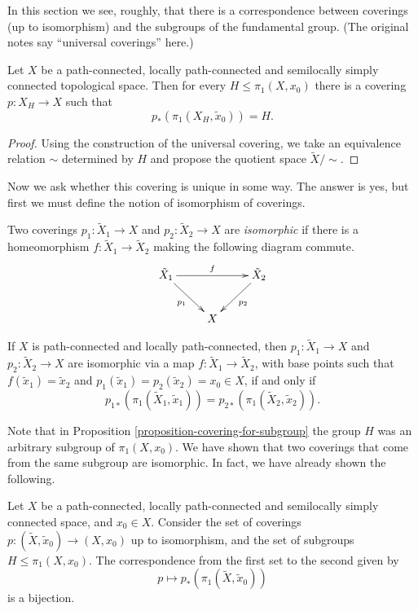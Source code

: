 In this section we see, roughly, that there
is a correspondence between coverings (up to
isomorphism) and the subgroups of the
fundamental group. (The original notes say
``universal coverings'' here.)

\begin{proposition}
\label{proposition-covering-for-subgroup}
Let $X$ be a path-connected, locally
path-connected and semilocally simply
connected topological space. Then for every
$H\leq\pi_1(X,x_0)$ there is a covering
$p:X_H\to X$ such that
$$
p_{*}\left(\pi_1(X_H,\tilde{x}_0)\right)=H.
$$
\end{proposition}

\begin{proof}
Using the construction of the universal
covering, we take an equivalence relation
$\sim$ determined by $H$ and propose the
quotient space $\tilde{X}/{\sim}$.
\end{proof}

Now we ask whether this covering is unique
in some way. The answer is yes, but first we
must define the notion of isomorphism of
coverings.

\begin{definition}
\label{definition-isomorphic-coverings}
Two coverings $p_1:\tilde{X}_1\to X$ and
$p_2:\tilde{X}_2\to X$ are {\it isomorphic}
if there is a homeomorphism
$f:\tilde{X}_1\to\tilde{X}_2$ making the
following diagram commute.
$$
\xymatrix{
\tilde{X}_1 \ar[dr]_{p_1} \ar[rr]^{f}
  && \tilde{X}_2 \ar[dl]^{p_2} \\
  & X
}
$$
\end{definition}

\begin{proposition}
\label{proposition-isomorphic-coverings}
If $X$ is path-connected and locally
path-connected, then
$p_1:\tilde{X}_1\to X$ and
$p_2:\tilde{X}_2\to X$ are isomorphic via a
map $f:\tilde{X}_1\to\tilde{X}_2$, with base
points such that
$f(\tilde{x}_1)=\tilde{x}_2$ and
$p_1(\tilde{x}_1)=p_2(\tilde{x}_2)=x_0
\in X$,
if and only if
$$
p_{1*}\left(\pi_1(\tilde{X}_1,\tilde{x}_1)
\right)
=p_{2*}\left(\pi_1(\tilde{X}_2,\tilde{x}_2)
\right).
$$
\end{proposition}

Note that in Proposition
\ref{proposition-covering-for-subgroup}
the group $H$ was an arbitrary subgroup of
$\pi_1(X,x_0)$. We have shown that two
coverings that come from the same subgroup
are isomorphic. In fact, we have already
shown the following.

\begin{theorem}
\label{theorem-classification-based-covers}
Let $X$ be a path-connected, locally
path-connected and semilocally simply
connected space, and $x_0\in X$. Consider
the set of coverings
$p:(\tilde{X},\tilde{x}_0)\to(X,x_0)$ up to
isomorphism, and the set of subgroups
$H\leq\pi_1(X,x_0)$. The correspondence
from the first set to the second given by
$$
p\longmapsto
p_*\left(\pi_1(\tilde{X},\tilde{x}_0)
\right)
$$
is a bijection.
\end{theorem}

